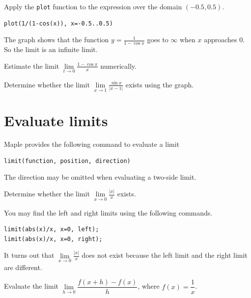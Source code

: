 \documentclass[en,11pt,simple]{elegantbook}
\let\BeginKnitrBlock\begin \let\EndKnitrBlock\end
\begin{document}
\BeginKnitrBlock{solution}{}{}
{}
Apply the \texttt{plot} function to the expression over the domain \((-0.5, 0.5)\).

\begin{verbatim}
plot(1/(1-cos(x)), x=-0.5..0.5)
\end{verbatim}

The graph shows that the function \(y=\frac{1}{1- \cos x}\) goes to \(\infty\) when \(x\) approaches \(0\). So the limit is an infinite limit.
\EndKnitrBlock{solution}

\BeginKnitrBlock{exercise}{}{}
\protect\hypertarget{exr:unnamed-chunk-18}{}{\label{exr:unnamed-chunk-18} }
Estimate the limit \(\lim\limits_{t \to 0}\frac{1-\cos x}{x}\) numerically.
\EndKnitrBlock{exercise}

\BeginKnitrBlock{exercise}{}{}
\protect\hypertarget{exr:unnamed-chunk-19}{}{\label{exr:unnamed-chunk-19} }
Determine whether the limit \(\lim\limits_{x \to 1}\frac{\sin x}{|x-1|}\) exists using the graph.
\EndKnitrBlock{exercise}

\hypertarget{evaluate-limits}{%
\section{Evaluate limits}\label{evaluate-limits}}

Maple provides the following command to evaluate a limit

\begin{verbatim}
limit(function, position, direction)
\end{verbatim}

The direction may be omitted when evaluating a two-side limit.

\BeginKnitrBlock{example}{}{}
\protect\hypertarget{exm:unnamed-chunk-20}{}{\label{exm:unnamed-chunk-20} }
Determine whether the limit \(\lim\limits_{x\to 0}\frac{|x|}{x}\) exists.
\EndKnitrBlock{example}

\BeginKnitrBlock{solution}{}{}
{}
You may find the left and right limits using the following commands.

\begin{verbatim}
limit(abs(x)/x, x=0, left);
limit(abs(x)/x, x=0, right);
\end{verbatim}

It turns out that \(\lim\limits_{x\to 0}\frac{|x|}{x}\) does not exist because the left limit and the right limit are different.
\EndKnitrBlock{solution}

\BeginKnitrBlock{example}{}{}
\protect\hypertarget{exm:unnamed-chunk-22}{}{\label{exm:unnamed-chunk-22} }
Evaluate the limit \(\lim\limits_{h\to 0}\dfrac{f(x+h)-f(x)}{h}\), where \(f(x)=\dfrac{1}{x}\).
\EndKnitrBlock{example}
\end{document}
